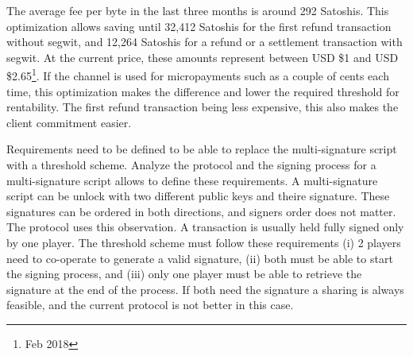 The average fee per byte in the last three months is around 292 Satoshis. This
optimization allows saving until 32,412 Satoshis for the first refund
transaction without \gls{segwit}, and 12,264 Satoshis for a refund or a
settlement transaction with \gls{segwit}. At the current price, these amounts
represent between USD \$1 and USD \$2.65\footnote{ Feb 2018}. If the channel is
used for micropayments such as a couple of cents each time, this optimization
makes the difference and lower the required threshold for rentability. The first
refund transaction being less expensive, this also makes the client commitment
easier.

Requirements need to be defined to be able to replace the multi-signature script
with a threshold scheme. Analyze the protocol and the signing process for a
multi-signature script allows to define these requirements. A multi-signature
script can be unlock with two different public keys and theire signature. These
signatures can be ordered in both directions, and signers order does not matter.
The protocol uses this observation. A transaction is usually held fully signed
only by one player. The threshold scheme must follow these requirements (i) 2
players need to co-operate to generate a valid signature, (ii) both must be able
to start the signing process, and (iii) only one player must be able to retrieve
the signature at the end of the process. If both need the signature a sharing is
always feasible, and the current protocol is not better in this case.

